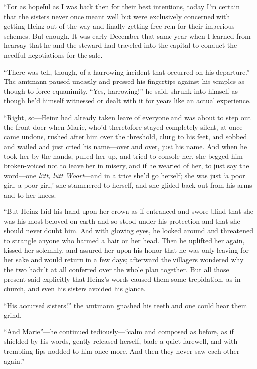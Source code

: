\documentclass[12pt,a4paper]{article}
\begin{document}
“For as hopeful as I was back then for their best intentions, today I’m certain that the sisters never once meant well but were exclusively concerned with getting Heinz out of the way and finally getting free rein for their imperious schemes. But enough. It was early December that same year when I learned from hearsay that he and the steward had traveled into the capital to conduct the needful negotiations for the sale.

“There was tell, though, of a harrowing incident that occurred on his departure.” The amtmann paused uneasily and pressed his fingertips against his temples as though to force equanimity. “Yes, harrowing!” he said, shrunk into himself as though he’d himself witnessed or dealt with it for years like an actual experience.

“Right, so—Heinz had already taken leave of everyone and was about to step out the front door when Marie, who’d theretofore stayed completely silent, at once came undone, rushed after him over the threshold, clung to his feet, and sobbed and wailed and just cried his name—over and over, just his name. And when he took her by the hands, pulled her up, and tried to console her, she begged him broken-voiced not to leave her in misery, and if he wearied of her, to just say the word—one \textit{lütt, lütt Woort}—and in a trice she’d go herself; she was just ‘a poor girl, a poor girl,’ she stammered to herself, and she glided back out from his arms and to her knees.

“But Heinz laid his hand upon her crown as if entranced and swore blind that she was his most beloved on earth and so stood under his protection and that she should never doubt him. And with glowing eyes, he looked around and threatened to strangle anyone who harmed a hair on her head. Then he uplifted her again, kissed her solemnly, and assured her upon his honor that he was only leaving for her sake and would return in a few days; afterward the villagers wondered why the two hadn’t at all conferred over the whole plan together. But all those present said explicitly that Heinz’s words caused them some trepidation, as in church, and even his sisters avoided his glance.

“His accursed sisters!” the amtmann gnashed his teeth and one could hear them grind.

“And Marie”—he continued tediously—“calm and composed as before, as if shielded by his words, gently released herself, bade a quiet farewell, and with trembling lips nodded to him once more. And then they never saw each other again.”
\end{document}

